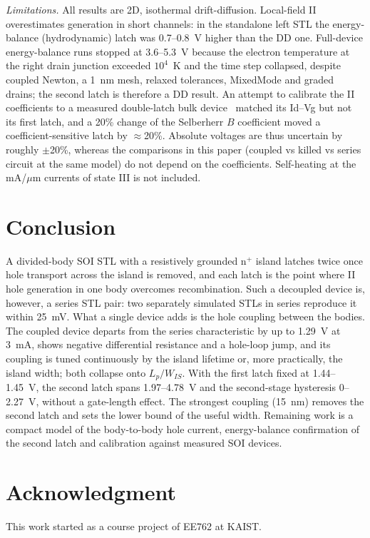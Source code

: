 \documentclass[journal]{IEEEtran}
\begin{document}
\textit{Limitations.} All results are 2D, isothermal drift-diffusion. Local-field II overestimates generation in short channels: in the standalone left STL the energy-balance (hydrodynamic) latch was 0.7--0.8~V higher than the DD one. Full-device energy-balance runs stopped at 3.6--5.3~V because the electron temperature at the right drain junction exceeded $10^4$~K and the time step collapsed, despite coupled Newton, a 1~nm mesh, relaxed tolerances, MixedMode and graded drains; the second latch is therefore a DD result. An attempt to calibrate the II coefficients to a measured double-latch bulk device~\cite{noh_triristor} matched its Id--Vg but not its first latch, and a 20\% change of the Selberherr $B$ coefficient moved a coefficient-sensitive latch by $\approx$20\%. Absolute voltages are thus uncertain by roughly $\pm$20\%, whereas the comparisons in this paper (coupled vs killed vs series circuit at the same model) do not depend on the coefficients. Self-heating at the mA/$\mu$m currents of state III is not included.

\section{Conclusion}
A divided-body SOI STL with a resistively grounded n$^+$ island latches twice once hole transport across the island is removed, and each latch is the point where II hole generation in one body overcomes recombination. Such a decoupled device is, however, a series STL pair: two separately simulated STLs in series reproduce it within 25~mV. What a single device adds is the hole coupling between the bodies. The coupled device departs from the series characteristic by up to 1.29~V at 3~mA, shows negative differential resistance and a hole-loop jump, and its coupling is tuned continuously by the island lifetime or, more practically, the island width; both collapse onto $L_p/W_{IS}$. With the first latch fixed at 1.44--1.45~V, the second latch spans 1.97--4.78~V and the second-stage hysteresis 0--2.27~V, without a gate-length effect. The strongest coupling (15~nm) removes the second latch and sets the lower bound of the useful width. Remaining work is a compact model of the body-to-body hole current, energy-balance confirmation of the second latch and calibration against measured SOI devices.

\section*{Acknowledgment}
This work started as a course project of EE762 at KAIST.
\end{document}
